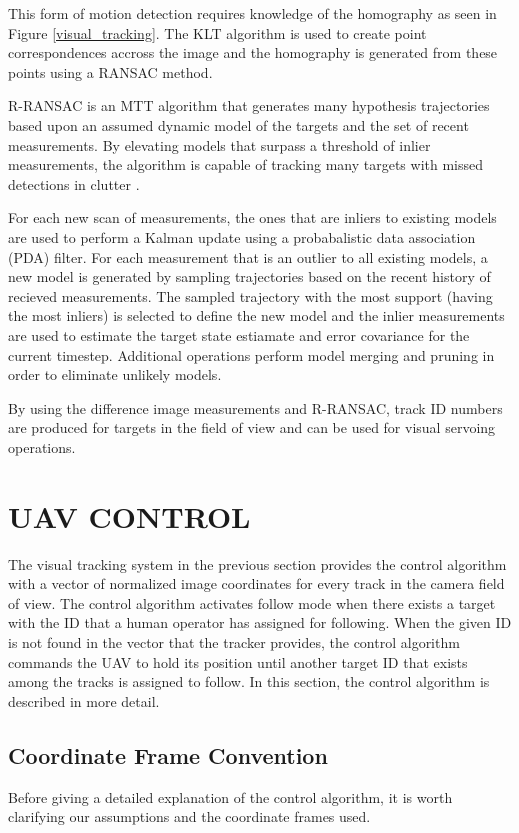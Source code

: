 \documentclass[letterpaper, 10 pt, conference]{ieeeconf}  %
\begin{document}
This form of motion detection requires knowledge of the homography as seen in Figure \ref{visual_tracking}. The KLT algorithm is used to create point correspondences accross the image and the homography is generated from these points using a RANSAC method.

R-RANSAC is an MTT algorithm that generates many hypothesis trajectories based upon an assumed dynamic model of the targets and the set of recent measurements. By elevating models that surpass a threshold of inlier measurements, the algorithm is capable of tracking many targets with missed detections in clutter \cite{Niedfeldt2014}.

For each new scan of measurements, the ones that are inliers to existing models are used to perform a Kalman update using a probabalistic data association (PDA) filter. For each measurement that is an outlier to all existing models, a new model is generated by sampling trajectories based on the recent history of recieved measurements. The sampled trajectory with the most support (having the most inliers) is selected to define the new model and the inlier measurements are used to estimate the target state estiamate and error covariance for the current timestep. Additional operations perform model merging and pruning in order to eliminate unlikely models.

By using the difference image measurements and R-RANSAC, track ID numbers are produced for targets in the field of view and can be used for visual servoing operations.

\section{UAV CONTROL}
	
The visual tracking system in the previous section provides the control algorithm with a vector of normalized image coordinates for every track in the camera field of view. The control algorithm activates follow mode when there exists a target with the ID that a human operator has assigned for following. When the given ID is not found in the vector that the tracker provides, the control algorithm commands the UAV to hold its position until another target ID that exists among the tracks is assigned to follow. In this section, the control algorithm is described in more detail.

\subsection{Coordinate Frame Convention}
Before giving a detailed explanation of the control algorithm, it is worth clarifying our assumptions and the coordinate frames used. 
\end{document}
